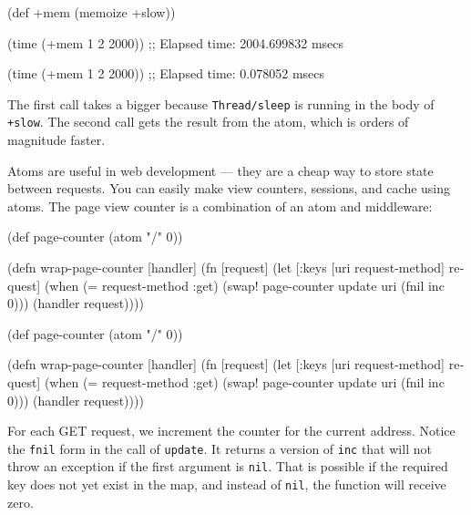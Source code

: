 \begin{english}
  \begin{clojure}
(def +mem (memoize +slow))

(time (+mem 1 2 2000))
;; Elapsed time: 2004.699832 msecs

(time (+mem 1 2 2000))
;; Elapsed time: 0.078052 msecs
  \end{clojure}
\end{english}


The first call takes a bigger because \verb|Thread/sleep| is running in the body of \verb|+slow|. The second call gets the result from the atom, which is orders of magnitude faster.


Atoms are useful in web development — they are a cheap way to store state between requests.
You can easily make view counters, sessions, and cache using atoms.
The page view counter is a combination of an atom and middleware:

\ifx\DEVICETYPE\MOBILE

\begin{english}
  \begin{clojure}
(def page-counter
  (atom {"/" 0}))

(defn wrap-page-counter
  [handler]
  (fn [request]
    (let [{:keys [uri request-method]}
          request]
      (when (= request-method :get)
        (swap! page-counter
          update uri (fnil inc 0)))
      (handler request))))
  \end{clojure}
\end{english}

\else

\begin{english}
  \begin{clojure}
(def page-counter
  (atom {"/" 0}))

(defn wrap-page-counter
  [handler]
  (fn [request]
    (let [{:keys [uri
                  request-method]} request]
      (when (= request-method :get)
        (swap! page-counter update uri (fnil inc 0)))
      (handler request))))
  \end{clojure}
\end{english}

\fi


For each GET request, we increment the counter for the current address.
Notice the \verb|fnil| form in the call of \verb|update|. It returns a version of \verb|inc| that will not throw an exception if the first argument is \verb|nil|.
That is possible if the required key does not yet exist in the map, and instead of \verb|nil|, the function will receive zero.

